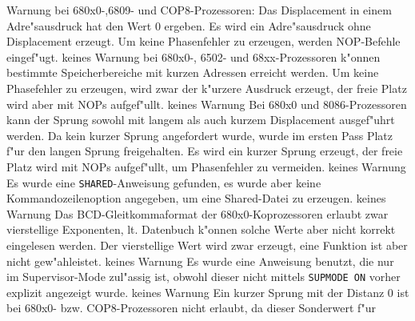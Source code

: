 \documentclass[12pt,a4paper,twoside]{report}
\newcommand{\tty}[1]{{\tt #1}}
\begin{document}
\begin{description}
               {Warnung}
               {bei 680x0-,6809- und COP8-Prozessoren: Das Displacement
                in einem Adre"sausdruck hat den Wert 0 ergeben.  Es wird
                ein  Adre"sausdruck  ohne Displacement erzeugt.  Um keine
                Phasenfehler zu erzeugen, werden NOP-Befehle eingef"ugt.}
               {keines}
               {Warnung}
               {bei 680x0-, 6502- und 68xx-Prozessoren k"onnen
                bestimmte Speicherbereiche mit kurzen Adressen erreicht
                werden.  Um keine Phasefehler zu erzeugen, wird zwar der
                k"urzere Ausdruck erzeugt, der freie Platz wird aber mit
                NOPs aufgef"ullt.}
               {keines}
               {Warnung}
               {Bei 680x0 und 8086-Prozessoren kann der Sprung
                sowohl mit langem als auch kurzem Displacement ausgef"uhrt
                werden.  Da kein kurzer Sprung angefordert wurde, wurde im
                ersten Pass Platz f"ur den langen Sprung freigehalten.
                Es wird ein kurzer Sprung erzeugt, der freie Platz wird
                mit NOPs aufgef"ullt, um Phasenfehler zu vermeiden.}
               {keines}
               {Warnung}
               {Es wurde eine \tty{SHARED}-Anweisung gefunden, es
                wurde aber keine Kommandozeilenoption angegeben, um eine
                Shared-Datei zu erzeugen.}
               {keines}
               {Warnung}
               {Das BCD-Gleitkommaformat der 680x0-Koprozessoren
                erlaubt zwar vierstellige Exponenten, lt. Datenbuch
                k"onnen solche Werte aber nicht korrekt eingelesen werden.
                Der vierstellige Wert wird zwar erzeugt, eine Funktion ist
                aber nicht gew"ahleistet.}
               {keines}
               {Warnung}
               {Es wurde eine Anweisung benutzt, die nur im
                Supervisor-Mode zul"assig ist, obwohl dieser nicht mittels
                \tty{SUPMODE ON} vorher explizit angezeigt wurde.}
               {keines}
               {Warnung}
               {Ein kurzer Sprung mit der Distanz 0 ist bei
                680x0- bzw. COP8-Prozessoren nicht erlaubt, da dieser Sonderwert f"ur
}
\end{description}
\end{document}
